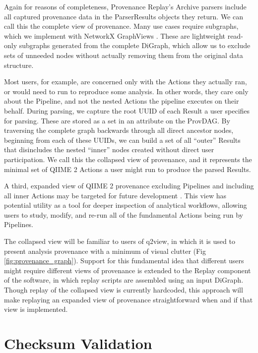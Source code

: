 Again for reasons of completeness, Provenance Replay’s Archive parsers include
all captured provenance data in the ParserResults objects they return. We can
call this the complete view of provenance. Many use cases require subgraphs,
which we implement with NetworkX GraphViews \parencite{hagberg_exploring_2008}.
These are lightweight read-only subgraphs generated from the complete DiGraph,
which allow us to exclude sets of unneeded nodes without actually removing them
from the original data structure.

Most users, for example, are concerned only with the Actions they actually ran,
or would need to run to reproduce some analysis. In other words, they care only
about the Pipeline, and not the nested Actions the pipeline executes on their
behalf. During parsing, we capture the root UUID of each Result a user specifies
for parsing. These are stored as a set in an attribute on the ProvDAG. By
traversing the complete graph backwards through all direct ancestor nodes,
beginning from each of these UUIDs, we can build a set of all “outer” Results
that disincludes the nested “inner” nodes created without direct user
participation. We call this the collapsed view of provenance, and it represents
the minimal set of QIIME 2 Actions a user might run to produce the parsed
Results.

A third, expanded view of QIIME 2 provenance excluding Pipelines and including
all inner Actions may be targeted for future development \parencite[Issue #74]{keefe_issues_2021}.
This view has potential utility as a tool for deeper inspection of analytical
workflows, allowing users to study, modify, and re-run all of the fundamental
Actions being run by Pipelines. 

The collapsed view will be familiar to users of q2view, in which it is used to
present analysis provenance with a minimum of visual clutter (Fig \ref{fig:provenance_graph}).
Support for this fundamental idea that different users might require different
views of provenance is extended to the Replay component of the software, in
which replay scripts are assembled using an input DiGraph. Though replay of the
collapsed view is currently hardcoded, this approach will make replaying an
expanded view of provenance straightforward when and if that view is
implemented.


\section{Checksum Validation}

